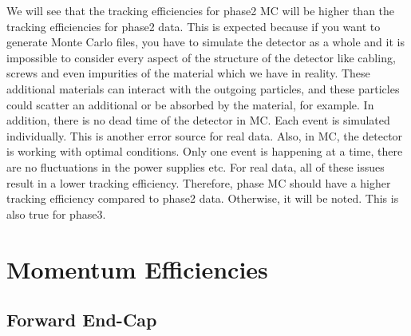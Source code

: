 \documentclass[a4paper,11pt,twosided,final,german,openbib,pdftex,listof=totoc,bibliography=totoc]{scrbook}
\begin{document}
We will see that the tracking efficiencies for phase2 MC will be higher than the tracking efficiencies for phase2 data. This is expected because if you want to generate Monte Carlo files, you have to simulate the detector as a whole and it is impossible to consider every aspect of the structure of the detector like cabling, screws and even impurities of the material which we have in reality. These additional materials can interact with the outgoing particles, and these particles could scatter an additional or be absorbed by the material, for example. In addition, there is no dead time of the detector in MC. Each event is simulated individually. This is another error source for real data. Also, in MC, the detector is working with optimal conditions. Only one event is happening at a time, there are no fluctuations in the power supplies etc.
For real data, all of these issues result in a lower tracking efficiency. Therefore, phase MC should have a higher tracking efficiency compared to phase2 data. Otherwise, it will be noted. This is also true for phase3.
 

\section{Momentum Efficiencies}


\subsection{Forward End-Cap}
\label{sec:MFC}
\end{document}
